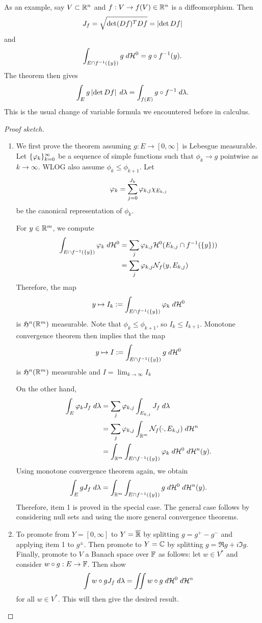 \documentclass[a4paper]{article}
\begin{document}
\begin{eg}
As an example, say $V \subset \mathbb{R}^n$ and 
$f : V \to f(V) \in \mathbb{R}^n$ is a diffeomorphism.
Then 
\[
J_f = \sqrt{\det (Df)^T Df} = \left\lvert \det Df\right\rvert
\]
and 
\[
\int_{E \cap f^{-1}(\{y\})} g \; d \mathcal{H}^0 = 
g \circ f^{-1}(y).
\]
The theorem then gives 
\[
\int_E g \left\lvert \det Df\right\rvert \; d \lambda 
= \int_{f(E)} g \circ f^{-1} \; d \lambda.
\]
This is the usual change of variable formula we encountered 
before in calculus.
\end{eg}

\begin{proof}[Proof sketch]
\begin{enumerate}
\item We first prove the theorem assuming $g : E \to [0, \infty]$
is Lebesgue measurable. Let $\{ \varphi_k \}_{k=0}^\infty$ be a sequence
of simple functions such that $\phi_k \to g$ pointwise
as $k \to \infty$. WLOG also assume $\phi_k \leq \phi_{k+1}$.
Let 
\[
\varphi_k = \sum_{j=0}^{J_k} \varphi_{k, j} \chi_{E_{k, j}}
\]
be the canonical representation of $\phi_k$. 

For $y \in \mathbb{R}^m$, we compute 
\[
\begin{aligned}
\int_{E \cap f^{-1}(\{y\})} \varphi_k \; d \mathcal{H}^0 
&= \sum_j \varphi_{k, j} \mathcal{H}^0(E_{k, j} \cap f^{-1}(\{y\})) \\
&= \sum_j \varphi_{k, j} \mathcal{N}_f (y, E_{k, j})
\end{aligned}
\]
Therefore, the map 
\[
y \mapsto I_k := \int_{E \cap f^{-1}(\{y\})} \varphi_k 
\; d \mathcal{H}^0 
\]
is $\mathfrak{H}^n(\mathbb{R}^m)$ measurable. 
Note that $\phi_k \leq \phi_{k+1}$, so $I_k \leq I_{k+1}$.
Monotone convergence theorem then implies that the map
\[
y \mapsto I := \int_{E \cap f^{-1}(\{y\})} g \; d \mathcal{H}^0
\] 
is $\mathfrak{H}^n(\mathbb{R}^m)$ measurable 
and $I = \lim_{k \to \infty} I_k$

On the other hand, 
\[
\begin{aligned}
\int_E \varphi_k J_f \; d \lambda 
&= \sum_j \varphi_{k, j} \int_{E_{k, j}} J_f \; d \lambda \\
&= \sum_j \varphi_{k, j} \int_{\mathbb{R}^m} \mathcal{N}_f(\cdot, E_{k, j})
\; d \mathcal{H}^n \\ 
&= \int_{\mathbb{R}^m} \int_{E \cap f^{-1}(\{y\})}
\varphi_k \; d \mathcal{H}^0 \; d \mathcal{H}^n(y).
\end{aligned}
\]
Using monotone convergence theorem again, we obtain 
\[
\int_E g J_f \; d \lambda = 
\int_{\mathbb{R}^m} \int_{E \cap f^{-1}(\{y\})} 
g \; d \mathcal{H}^0 \; d \mathcal{H}^n (y).
\]
Therefore, item 1 is proved in the special case. 
The general case follows by considering null sets and 
using the more general convergence theorems.

\item To promote from $Y = [0, \infty]$
to $Y = \overline{\mathbb{R}}$ by splitting $g = g^+ - g^-$ and 
applying item 1 to $g^{\pm}$. Then promote to 
$Y = \mathbb{C}$ by splitting $g = \Re g + i \Im g$.
Finally, promote to $V$ a Banach space over $\mathbb{F}$ as follows:
let $w \in V^*$ and consider $w \circ g : E \to \mathbb{F}$.
Then show 
\[
\int w \circ g J_f \; d \lambda = \iint w \circ g \; d \mathcal{H}^0 \; d \mathcal{H}^n
\]
for all $w \in V^*$. This will then give the desired
result.

\end{enumerate}
\end{proof}
\end{document}

